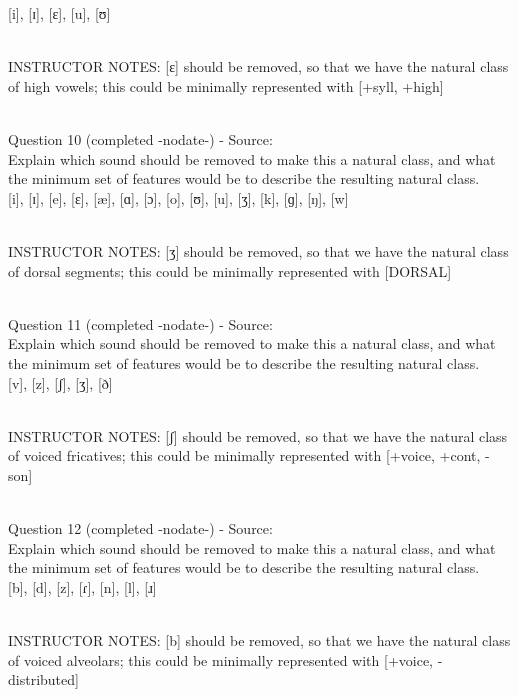 \documentclass[12pt]{article}
\begin{document}
{[i]}, {[ɪ]}, {[ɛ]}, {[u]}, {[ʊ]}


~\\
INSTRUCTOR NOTES: [ɛ] should be removed, so that we have the natural class of high vowels; this could be minimally represented with [+syll, +high]


~\\

{\large Question 10} (completed -nodate-) - Source: \\

Explain which sound should be removed to make this a natural class, and what the minimum set of features would be to describe the resulting natural class.\\

{[i]}, {[ɪ]}, {[e]}, {[ɛ]}, {[æ]}, {[ɑ]}, {[ɔ]}, {[o]}, {[ʊ]}, {[u]}, {[ʒ]}, {[k]}, {[ɡ]}, {[ŋ]}, {[w]}


~\\
INSTRUCTOR NOTES: [ʒ] should be removed, so that we have the natural class of dorsal segments; this could be minimally represented with [DORSAL]


~\\

{\large Question 11} (completed -nodate-) - Source: \\

Explain which sound should be removed to make this a natural class, and what the minimum set of features would be to describe the resulting natural class.\\

{[v]}, {[z]}, {[ʃ]}, {[ʒ]}, {[ð]}


~\\
INSTRUCTOR NOTES: [ʃ] should be removed, so that we have the natural class of voiced fricatives; this could be minimally represented with [+voice, +cont, -son]


~\\

{\large Question 12} (completed -nodate-) - Source: \\

Explain which sound should be removed to make this a natural class, and what the minimum set of features would be to describe the resulting natural class.\\

{[b]}, {[d]}, {[z]}, {[ɾ]}, {[n]}, {[l]}, {[ɹ]}


~\\
INSTRUCTOR NOTES: [b] should be removed, so that we have the natural class of voiced alveolars; this could be minimally represented with [+voice, -distributed]
\end{document}
